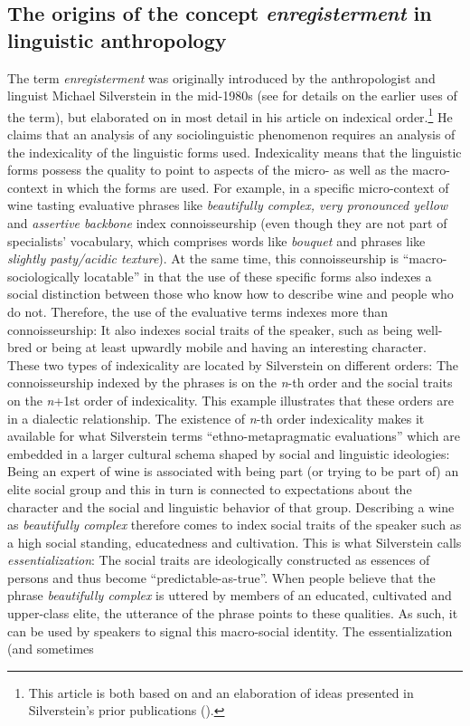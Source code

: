 \subsection{The origins of the concept \textit{enregisterment} in linguistic anthropology}
\label{bkm:Ref506883801}\hypertarget{Toc63021211}{}\label{bkm:Ref512260235}
The term \textit{enregisterment} was originally introduced by the anthropologist and linguist Michael Silverstein in the mid-1980s (see \citealt{Silverstein2016} for details on the earlier uses of the term), but elaborated on in most detail in his \citeyear{Silverstein2003} article on indexical order.\footnote{This article is both based on and an elaboration of ideas presented in Silverstein’s prior publications (\citeyear{Silverstein1979, Silverstein1993}).}  He claims that an analysis of any sociolinguistic phenomenon requires an analysis of the indexicality of the linguistic forms used. Indexicality means that the linguistic forms possess the quality to point to aspects of the micro- as well as the macro-context in which the forms are used. For example, in a specific micro-context of wine tasting evaluative phrases like \emph{beautifully complex, very pronounced yellow} and \emph{assertive backbone} index connoisseurship (even though they are not part of specialists’ vocabulary, which comprises words like \emph{bouquet} and phrases like \emph{slightly pasty/acidic texture}). At the same time, this connoisseurship is “macro-sociologically locatable” \citep[226]{Silverstein2003} in that the use of these specific forms also indexes a social distinction between those who know how to describe wine and people who do not. Therefore, the use of the evaluative terms indexes more than connoisseurship: It also indexes social traits of the speaker, such as being well-bred or being at least upwardly mobile and having an interesting character. These two types of indexicality are located by Silverstein on different orders: The connoisseurship indexed by the phrases is on the \emph{n}{}-th order and the social traits on the \emph{n}+1st order of indexicality. This example illustrates that these orders are in a dialectic relationship. The existence of \emph{n}{}-th order indexicality makes it available for what Silverstein terms “ethno-metapragmatic evaluations” \citep[214]{Silverstein2003} which are embedded in a larger cultural schema shaped by social and linguistic ideologies: Being an expert of wine is associated with being part (or trying to be part of) an elite social group and this in turn is connected to expectations about the character and the social and linguistic behavior of that group. Describing a wine as \emph{beautifully complex} therefore comes to index social traits of the speaker such as a high social standing, educatedness and cultivation. This is what Silverstein calls \textit{essentialization}: The social traits are ideologically constructed as essences of persons and thus become “predictable-as-true”. When people believe that the phrase \emph{beautifully complex} is uttered by members of an educated, cultivated and upper-class elite, the utterance of the phrase points to these qualities. As such, it can be used by speakers to signal this macro-social identity. The essentialization (and sometimes 